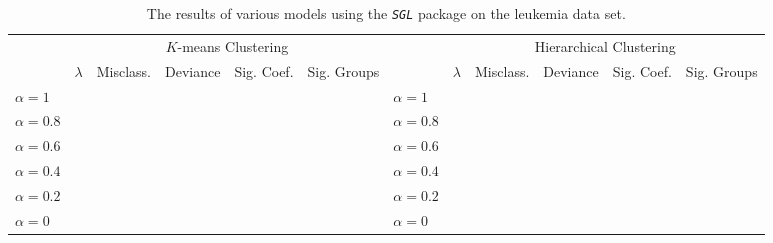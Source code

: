 \documentclass[10pt]{article}
\begin{document}
\begin{landscape}
\begin{table}[ht]
    \begin{tabularx}{\linewidth}{lccccclccccc} \toprule
         & \multicolumn{5}{c}{$K$-means Clustering} &  &  \multicolumn{5}{c}{Hierarchical Clustering} \\ \cmidrule(r){2-6} \cmidrule(lr){8-12}
         & $\lambda$ & Misclass. & Deviance & Sig. Coef. & Sig. Groups & & $\lambda$ & Misclass. & Deviance & Sig. Coef. & Sig. Groups\\ \midrule
        $\alpha = 1$   &  &  &  &  &  & $\alpha = 1$   &  &  &  &  &  \\ 
        $\alpha = 0.8$ &  &  &  &  &  & $\alpha = 0.8$ &  &  &  &  &  \\ 
        $\alpha = 0.6$ &  &  &  &  &  & $\alpha = 0.6$ &  &  &  &  &  \\ 
        $\alpha = 0.4$ &  &  &  &  &  & $\alpha = 0.4$ &  &  &  &  &  \\ 
        $\alpha = 0.2$ &  &  &  &  &  & $\alpha = 0.2$ &  &  &  &  &  \\
        $\alpha = 0$   &  &  &  &  &  & $\alpha = 0$   &  &  &  &  &  \\ \bottomrule
    \end{tabularx}
    \caption{The results of various models using the \emph{\texttt{SGL}} package on the leukemia data set.}
    \label{SGLleuktab}
\end{table}

\end{landscape}

\newpage
\end{document}
